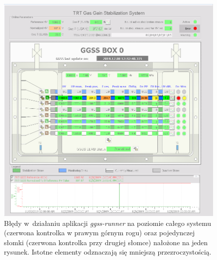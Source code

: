 \begin{figure}
\centering
\includegraphics[width=\textwidth]{res/png/ggssErrors}
\caption{Błędy w~działaniu aplikacji \textit{ggss-runner} na poziomie całego systemu (czerwona kontrolka w prawym górnym rogu) oraz pojedynczej słomki (czerwona kontrolka przy drugiej słomce) nałożone na jeden rysunek. Istotne elementy odznaczają się mniejszą przezroczystością.}
\label{fig:ggssErrorScada}
\end{figure}

